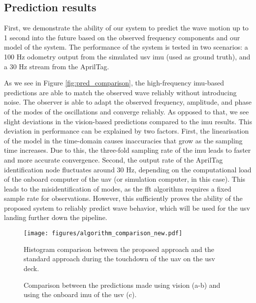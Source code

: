 \documentclass[letterpaper, 10 pt, journal, twoside]{IEEEtran}
\begin{document}
\subsection{Prediction results}

First, we demonstrate the ability of our system to predict the wave motion up to 1 second into the future based on the observed frequency components and our model of the system. The performance of the system is tested in two scenarios: a 100 Hz odometry output from the simulated \ac{usv} \ac{imu} (used as ground truth), and a 30 Hz stream from the AprilTag.


As we see in Figure \ref{fig:pred_comparison}, the high-frequency \ac{imu}-based predictions are able to match the observed wave reliably without introducing noise. The observer is able to adapt the observed frequency, amplitude, and phase of the modes of the oscillations and converge reliably. As opposed to that, we see slight deviations in the vision-based predictions compared to the \ac{imu} results. This deviation in performance can be explained by two factors. First, the linearisation of the model in the time-domain causes inaccuracies that grow as the sampling time increases. Due to this, the three-fold sampling rate of the \ac{imu} leads to faster and more accurate convergence. Second, the output rate of the AprilTag identification node fluctuates around 30 Hz, depending on the computational load of the onboard computer of the \ac{uav} (or simulation computer, in this case). This leads to the misidentification of modes, as the \ac{fft} algorithm requires a fixed sample rate for observations. However, this sufficiently proves the ability of the proposed system to reliably predict wave behavior, which will be used for the \ac{usv} landing further down the pipeline.



\begin{figure}[!t]
    \centering
    \texttt{[image: figures/algorithm\_comparison\_new.pdf]}
    \caption{Histogram comparison between the proposed approach and the standard approach during the touchdown of the \ac{uav} on the \ac{usv} deck.}
    \label{fig:angle_comparison}
\end{figure}

\begin{figure*}[!b]
\centering
{}
{}
\caption{Comparison between the predictions made using vision (a-b) and using the onboard \ac{imu} of the \ac{usv} (c).}
\label{fig:real_pred_comparison}
\end{figure*}
\end{document}
